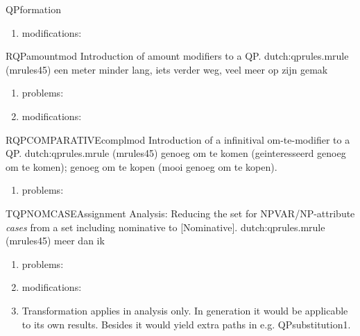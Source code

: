 \begin{mruleclass}{QPformation}
\begin{members}
\begin{member}
\begin{enumerate}
\item modifications:\\

\end{enumerate}

\end{member}
\begin{member}
 RQPamountmod
 Introduction of amount modifiers to a QP.
\file dutch:qprules.mrule (mrules45)
\semantics \nosemantics
\example een meter minder lang, iets verder weg, 
veel meer op zijn gemak
\remarks\mbox{}
\begin{enumerate}
\item problems:\\

\item modifications:\\

\end{enumerate}

\end{member}
\begin{member}
 RQPCOMPARATIVEcomplmod
 Introduction of a infinitival om-te-modifier to a QP.
\file dutch:qprules.mrule (mrules45)
\semantics \nosemantics
\example genoeg om te komen (geinteresseerd genoeg om te 
komen);
genoeg om te kopen (mooi genoeg om te kopen).
\remarks\mbox{}
\begin{enumerate}
\item problems: 
\\ 

\end{enumerate}

\end{member}
\begin{member}
 TQPNOMCASEAssignment
 Analysis: Reducing the set for NPVAR/NP-attribute {\em cases} 
from a set including nominative to
[Nominative].
\file dutch:qprules.mrule (mrules45)
\semantics \nosemantics
\example meer dan ik
\remarks\mbox{}
\begin{enumerate}
\item problems:\\

\item modifications:\\
\item Transformation applies in analysis only. In generation 
it would be applicable to its own results. Besides it would yield extra paths 
in e.g. QPsubstitution1.
\end{enumerate}


\end{member}
\end{members}
\end{mruleclass}
